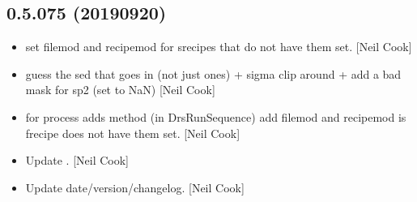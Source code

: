 \documentclass[a4paper,10pt,english]{report}
\begin{document}
\subsection{0.5.075 (2019\sphinxhyphen{}09\sphinxhyphen{}20)}
\label{\detokenize{misc/changelog:id86}}\begin{itemize}
\item {} 
 \sphinxhyphen{} set filemod and recipemod for
srecipes that do not have them set. {[}Neil Cook{]}

\item {} 
 \sphinxhyphen{} guess the sed that goes in (not just
ones) + sigma clip around  + add a bad mask for sp2 (set to NaN)
{[}Neil Cook{]}

\item {} 
 \sphinxhyphen{} for process adds method (in DrsRunSequence) add
filemod and recipemod is frecipe does not have them set. {[}Neil Cook{]}

\item {} 
Update . {[}Neil Cook{]}

\item {} 
Update date/version/changelog. {[}Neil Cook{]}

\end{itemize}
\end{document}
